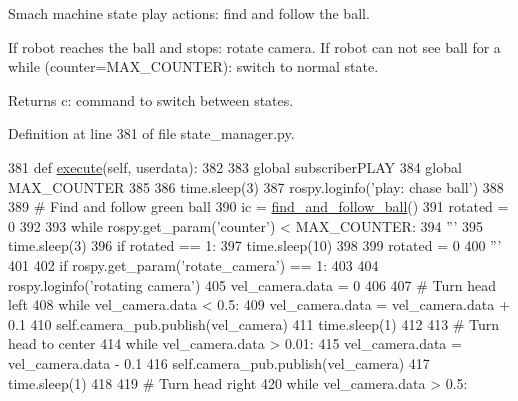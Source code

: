 Smach machine state play actions\+: find and follow the ball. 

If robot reaches the ball and stops\+: rotate camera. If robot can not see ball for a while (counter=M\+A\+X\+\_\+\+C\+O\+U\+N\+T\+ER)\+: switch to normal state. \begin{DoxyReturn}{Returns}
c\+: command to switch between states. 
\end{DoxyReturn}


Definition at line 381 of file state\+\_\+manager.\+py.


\begin{DoxyCode}
381     \textcolor{keyword}{def }\hyperlink{classstate__manager_1_1MIRO__Play_a781db4be4fcbb313c46097a8fdf06275}{execute}(self, userdata):
382 
383         \textcolor{keyword}{global} subscriberPLAY
384         \textcolor{keyword}{global} MAX\_COUNTER
385 
386         time.sleep(3)
387         rospy.loginfo(\textcolor{stringliteral}{'play: chase ball'})
388 
389         \textcolor{comment}{# Find and follow green ball}
390         ic = \hyperlink{classstate__manager_1_1find__and__follow__ball}{find\_and\_follow\_ball}()
391         rotated = 0
392 
393         \textcolor{keywordflow}{while} rospy.get\_param(\textcolor{stringliteral}{'counter'}) < MAX\_COUNTER:
394             \textcolor{stringliteral}{'''}
395 \textcolor{stringliteral}{            time.sleep(3)}
396 \textcolor{stringliteral}{            if rotated == 1:}
397 \textcolor{stringliteral}{                time.sleep(10)}
398 \textcolor{stringliteral}{}
399 \textcolor{stringliteral}{            rotated = 0}
400 \textcolor{stringliteral}{            '''}
401 
402             \textcolor{keywordflow}{if} rospy.get\_param(\textcolor{stringliteral}{'rotate\_camera'}) == 1:
403 
404                 rospy.loginfo(\textcolor{stringliteral}{'rotating camera'})
405                 vel\_camera.data = 0
406 
407                 \textcolor{comment}{# Turn head left}
408                 \textcolor{keywordflow}{while} vel\_camera.data < 0.5:
409                     vel\_camera.data = vel\_camera.data + 0.1
410                     self.camera\_pub.publish(vel\_camera)
411                     time.sleep(1)
412 
413                 \textcolor{comment}{# Turn head to center}
414                 \textcolor{keywordflow}{while} vel\_camera.data > 0.01:
415                     vel\_camera.data = vel\_camera.data - 0.1
416                     self.camera\_pub.publish(vel\_camera)
417                     time.sleep(1)
418 
419                 \textcolor{comment}{# Turn head right}
420                 \textcolor{keywordflow}{while} vel\_camera.data > 0.5:

\end{DoxyCode}
